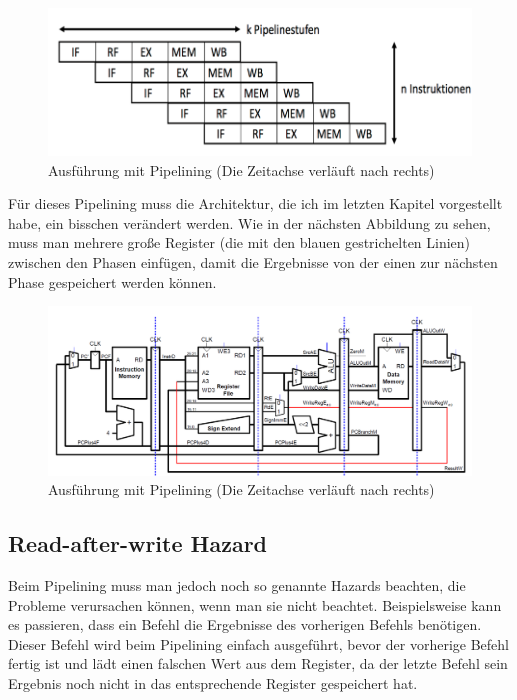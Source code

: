 \documentclass[12pt, a4paper]{article}
\begin{document}
\begin{figure}[H]
	\begin{center}
		\includegraphics [width=15cm]{Pipelining.png}
	\end{center}
	\caption{Ausführung mit Pipelining (Die Zeitachse verläuft nach rechts)}
\end{figure}

Für dieses Pipelining muss die Architektur, die ich im letzten Kapitel vorgestellt habe, ein bisschen verändert werden. Wie in der nächsten Abbildung zu sehen, muss man mehrere große Register (die mit den blauen gestrichelten Linien) zwischen den Phasen einfügen, damit die Ergebnisse von der einen zur nächsten Phase gespeichert werden können.

\begin{figure}[H]
	\begin{center}
		\includegraphics [width=17cm]{Prozessor9.png}
	\end{center}
	\caption{Ausführung mit Pipelining (Die Zeitachse verläuft nach rechts)}
\end{figure}

\subsection{Read-after-write Hazard}
Beim Pipelining muss man jedoch noch so genannte Hazards beachten, die Probleme verursachen können, wenn man sie nicht beachtet. Beispielsweise kann es passieren, dass ein Befehl die Ergebnisse des vorherigen Befehls benötigen. Dieser Befehl wird beim Pipelining einfach ausgeführt, bevor der vorherige Befehl fertig ist und lädt einen falschen Wert aus dem Register, da der letzte Befehl sein Ergebnis noch nicht in das entsprechende Register gespeichert hat.
\end{document}
